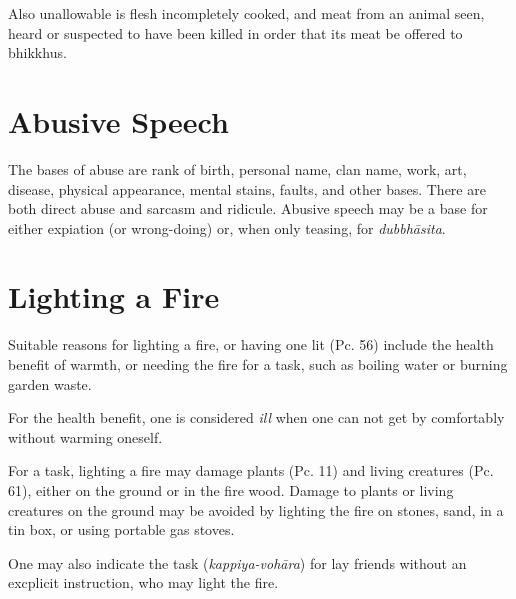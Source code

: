 Also unallowable is flesh incompletely cooked, and meat from an animal seen,
heard or suspected to have been killed in order that its meat be offered to
bhikkhus.\\
\mbox{}

\section*{Abusive Speech}

The bases of abuse are rank of birth, personal name, clan name, work, art,
disease, physical appearance, mental stains, faults, and other bases. There are
both direct abuse and sarcasm and ridicule. Abusive speech may be a base for
either expiation (or wrong-doing) or, when only teasing, for \emph{dubbhāsita}.


\section*{Lighting a Fire}

Suitable reasons for lighting a fire, or having one lit (Pc. 56) include the
health benefit of warmth, or needing the fire for a task, such as boiling water
or burning garden waste.

For the health benefit, one is considered \emph{ill} when one can not get by
comfortably without warming oneself.

For a task, lighting a fire may damage plants (Pc. 11) and living creatures (Pc.
61), either on the ground or in the fire wood. Damage to plants or living
creatures on the ground may be avoided by lighting the fire on stones, sand, in
a tin box, or using portable gas stoves.

One may also indicate the task (\emph{kappiya-vohāra}) for lay friends without
an excplicit instruction, who may light the fire.

